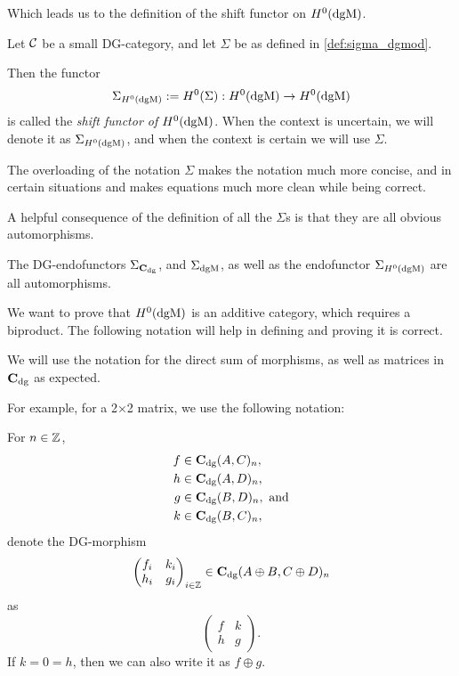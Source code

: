 Which leads us to the definition of the shift functor on \( H^0(\operatorname{dgM}) \).

\begin{definition}
    \label{def:sigma_h_0_dgmod}
    Let \( {\mathcal{C}} \) be a small DG-category, and let \( \Sigma \) be as defined in \autoref{def:sigma_dgmod}.

    Then the functor
    \[
        \Sigma_{H^0(\operatorname{dgM})} := H^0(\Sigma): H^0(\operatorname{dgM}) \to H^0(\operatorname{dgM})
    \]
    is called the \emph{shift functor of \( H^0(\operatorname{dgM}) \)}. When the context is uncertain, we will denote it as \( \Sigma_{H^0(\operatorname{dgM})} \), and when the context is certain we will use \( \Sigma \).
\end{definition}

The overloading of the notation \( \Sigma \) makes the notation much more concise, and in certain situations and makes equations much more clean while being correct.

A helpful consequence of the definition of all the \( \Sigma \)s is that they are all obvious automorphisms.
\begin{remark}
    \label{rem:dgm_sigma_automorphism}
    The DG-endofunctors \( \Sigma_{\operatorname{\mathbf{C}}_{\operatorname{dg}}} \), and \( \Sigma_{\operatorname{dgM}} \), as well as the endofunctor \( \Sigma_{H^0(\operatorname{dgM})} \) are all automorphisms.
\end{remark}

We want to prove that \( H^0(\operatorname{dgM}) \) is an additive category, which requires a biproduct. The following notation will help in defining and proving it is correct.

\begin{notation}
    \label{not:c_dg_matrix_direct_sum}
    We will use the notation for the direct sum of morphisms, as well as matrices in \( \operatorname{\mathbf{C}}_{\operatorname{dg}} \) as expected.

    For example, for a 2×2 matrix, we use the following notation:

    For \( n \in {\mathbb{Z}} \),
    \begin{align*}
        f &\in \operatorname{\mathbf{C}}_{\operatorname{dg}}(A, C)_n, \\
        h &\in \operatorname{\mathbf{C}}_{\operatorname{dg}}(A, D)_n, \\
        g &\in \operatorname{\mathbf{C}}_{\operatorname{dg}}(B, D)_n, \text{ and} \\
        k &\in \operatorname{\mathbf{C}}_{\operatorname{dg}}(B, C)_n,
    \end{align*}
    denote the DG-morphism
    \[
        \begin{pmatrix}
            f_i & k_i \\
            h_i & g_i
        \end{pmatrix}_{i \in {\mathbb{Z}}}
        \in
        \operatorname{\mathbf{C}}_{\operatorname{dg}}(A \oplus B, C \oplus D)_n
    \]
    as
    \[
        \begin{pmatrix}
            f & k \\
            h & g
        \end{pmatrix}.
    \]
    If \( k = 0 = h \), then we can also write it as \( f \oplus g \).
\end{notation}

